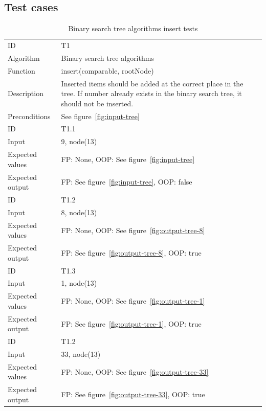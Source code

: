 \documentclass {article}
\begin{document}
\subsection{Test cases}
\begin{table}[H]
\begin{tabular}{ | l p{10cm} | }
\hline
ID & T1 \\
Algorithm & Binary search tree algorithms \\
Function & insert(comparable, rootNode) \\
Description & Inserted items should be added at the correct place in the tree. If number already exists in the binary search tree, it should not be inserted. \\
Preconditions & See figure~\ref{fig:input-tree} \\
\hline
ID & T1.1 \\
Input & 9, node(13) \\
Expected values & FP: None, OOP: See figure~\ref{fig:input-tree} \\
Expected output & FP: See figure~\ref{fig:input-tree}, OOP: false \\
\hline
ID & T1.2 \\
Input & 8, node(13) \\
Expected values & FP: None, OOP: See figure~\ref{fig:output-tree-8} \\
Expected output & FP: See figure~\ref{fig:output-tree-8}, OOP: true \\
\hline
ID & T1.3 \\
Input & 1, node(13) \\
Expected values & FP: None, OOP: See figure~\ref{fig:output-tree-1} \\
Expected output & FP: See figure~\ref{fig:output-tree-1}, OOP: true \\
\hline
ID & T1.2 \\
Input & 33, node(13) \\
Expected values & FP: None, OOP: See figure~\ref{fig:output-tree-33} \\
Expected output & FP: See figure~\ref{fig:output-tree-33}, OOP: true \\
\hline
\end{tabular}
\caption{Binary search tree algorithms insert tests}
\label{tab:insert-tests}
\end{table}
\end{document}
